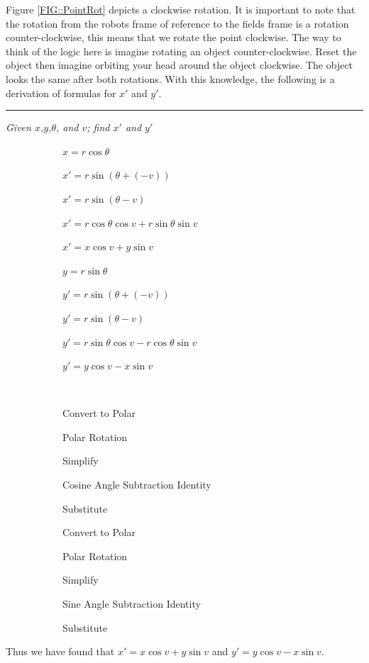 \documentclass[12pt]{article}
\newcommand{\rulesep}{\unskip\ \vrule\ }
\begin{document}
Figure \ref{FIG::PointRot} depicts a clockwise rotation. It is important to note that the rotation from the
robots frame of reference to the fields frame is a rotation counter-clockwise, this means that we
rotate the point clockwise. The way to think of the logic here is imagine rotating an object
counter-clockwise. Reset the object then imagine orbiting your head around the object clockwise.
The object looks the same after both rotations. With this knowledge, the following is a
derivation of formulas for $x'$ and $y'$.

\centering
\hrule
\textit{Given $x$,$y$,$\theta$, and $v$; find $x'$ and $y'$}

\begin{figure}[h]
    \begin{subfigure}{0.5\textwidth}
        \centering
        $x=r\cos\theta$

        $x'=r\sin(\theta+(-v))$

        $x'=r\sin(\theta-v)$

        $x'=r\cos\theta\cos v + r\sin\theta\sin v$

        $x'=x\cos v + y\sin v$

        $y=r\sin\theta$

        $y'=r\sin(\theta+(-v))$

        $y'=r\sin(\theta-v)$

        $y'=r\sin\theta\cos v - r\cos\theta\sin v$

        $y'=y\cos v - x\sin v$
    \end{subfigure}%
    \rulesep
    \begin{subfigure}{0.5\textwidth}
        \centering
        Convert to Polar

        Polar Rotation

        Simplify

        Cosine Angle Subtraction Identity

        Substitute

        Convert to Polar

        Polar Rotation

        Simplify

        Sine Angle Subtraction Identity

        Substitute

    \end{subfigure}
\end{figure}

\raggedright
Thus we have found that $x' = x\cos v + y\sin v$ and $y'=y\cos v - x\sin v$.
\end{document}
